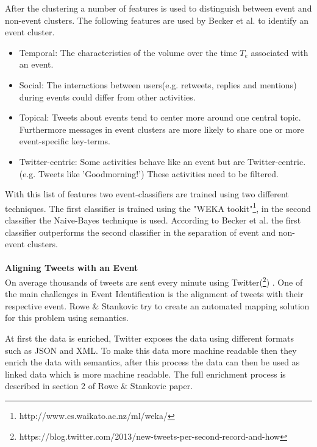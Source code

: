 \documentclass{article}
\begin{document}
After the clustering a number of features is used to distinguish between event and non-event clusters. The following features are used by Becker et al. to identify an event cluster. \cite{eventident} 
\begin{itemize}
  \item Temporal: The characteristics of the volume over the time $T_e$ associated with an event. 
  \item Social: The interactions between users(e.g. retweets, replies and mentions) during events could differ from other activities. 
  \item Topical: Tweets about events tend to center more around one central topic. Furthermore messages in event clusters are more likely to share one or more event-specific key-terms.  
  \item Twitter-centric: Some activities behave like an event but are Twitter-centric.(e.g. Tweets like 'Goodmorning!') These activities need to be filtered. 
\end{itemize}

With this list of features two event-classifiers are trained using two different techniques. The first classifier is trained using the "WEKA tookit"\footnote{http://www.cs.waikato.ac.nz/ml/weka/}, in the second classifier the  Naive-Bayes technique is used. According to Becker et al. the first classifier outperforms the second classifier in the separation of event and non-event clusters. \cite{eventident}
\\\\
\textbf{Aligning Tweets with an Event} \\
On average thousands of tweets are sent every minute using Twitter(\footnote{https://blog.twitter.com/2013/new-tweets-per-second-record-and-how}) . One of the main challenges in Event Identification is the alignment of tweets with their respective event. Rowe \& Stankovic try to create an automated mapping solution for this problem using semantics. \cite{eventalign}


At first the data is enriched, Twitter exposes the data using different formats such as JSON and XML. To make this data more machine readable then they enrich the data with semantics, after this process the data can then  be used as linked data which is more machine readable. The full enrichment process is described in section 2 of Rowe \& Stankovic paper. \cite{eventalign}
\end{document}
